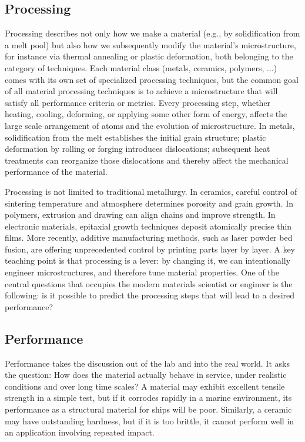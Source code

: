 \subsection{Processing}
\label{\chabbr:ssec:processing}

Processing describes not only how we make a material (e.g., by solidification from a melt pool) but also how we subsequently modify the material's microstructure, for instance via thermal annealing or plastic deformation, both belonging to the category of  techniques.    Each material class (metals, ceramics, polymers, $\ldots$) comes with its own set of specialized processing techniques, but the common goal of all material processing techniques is to achieve a microstructure that will satisfy all performance criteria or metrics.   Every processing step, whether heating, cooling, deforming, or applying some other form of energy, affects the large scale arrangement of atoms and the evolution of microstructure. In metals, solidification from the melt establishes the initial grain structure; plastic deformation by rolling or forging introduces dislocations; subsequent heat treatments can reorganize those dislocations and thereby affect the mechanical performance of the material.

Processing is not limited to traditional metallurgy. In ceramics, careful control of sintering temperature and atmosphere determines porosity and grain growth. In polymers, extrusion and drawing can align chains and improve strength. In electronic materials, epitaxial growth techniques deposit atomically precise thin films. More recently, additive manufacturing methods, such as laser powder bed fusion, are offering unprecedented control by  printing parts layer by layer. A key teaching point is that processing is a lever: by changing it, we can intentionally engineer microstructures, and therefore tune material properties.  One of the central questions that occupies the modern materials scientist or engineer is  the following: is it possible to predict the processing steps that will lead to a desired performance?


\subsection{Performance}
\label{\chabbr:ssec:performance}

Performance takes the discussion out of the lab and into the real world. It asks the question: How does the material actually behave in service, under realistic conditions and over long time scales? A material may exhibit excellent tensile strength in a simple test, but if it corrodes rapidly in a marine environment, its performance as a structural material for ships will be poor. Similarly, a ceramic may have outstanding hardness, but if it is too brittle, it cannot perform well in an application involving repeated impact.

